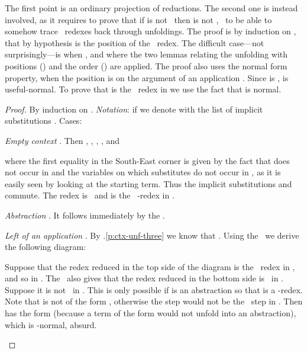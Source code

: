 The first point is an ordinary projection of reductions. The second one is instead involved, as it requires to prove that if  is not \lo\ then  is not \lou, \ie\ to be able to somehow trace \lo\ redexes back through unfoldings. The proof is by induction on , that by hypothesis is the position of the \lou\ redex. The difficult case---not surprisingly---is when , and where the two lemmas relating the unfolding with positions () and the order () are applied. The proof also uses the normal form property, when the position  is on the argument  of an application . Since  is \lou,  is useful-normal. To prove that  is the \lo\  redex in  we use the fact that  is normal. 


\begin{proof}
By induction on . \emph{Notation}: if  we denote with  the list of implicit substitutions . Cases:
\begin{varenumerate}
	\item \emph{Empty context }. Then , , , , and
		\begin{center}
			\commDiagramRed{            }{
													       }{
											}{
											 }{
											}{}{\unfsym}{\unfsym}
		\end{center}
		where the first equality in the South-East corner is given by the fact that  does not occur in  and the variables on which  substitutes do not occur in , as it is easily seen by looking at the starting term. Thus the implicit substitutions  and  commute. The redex  is \lou\ and  is the \lo\ -redex in .
		
		
	\item \emph{Abstraction }. It follows immediately by the \ih.
	
	\item \emph{Left of an application }. By .\ref{p:ctx-unf-three} we know that . Using the \ih\ we derive the following diagram:		
		\begin{center}
			\commDiagramRed{}{}{}{}{}{}{\unfsym}{\unfsym}
		\end{center}
		Suppose that the redex  reduced in the top side of the diagram is the \lou\ redex in , and so in . The \ih\ also gives that the  redex  reduced in the bottom side is \lo\ in . Suppose it is not \lo\ in . This is only possible if  is an abstraction so that  is a -redex. Note that  is not of the form , otherwise the step  would not be the \lou\ step in . Then  has the form  (because a term of the form  would not unfold into an abstraction), which is -normal, absurd.


\end{varenumerate}
\end{proof}

